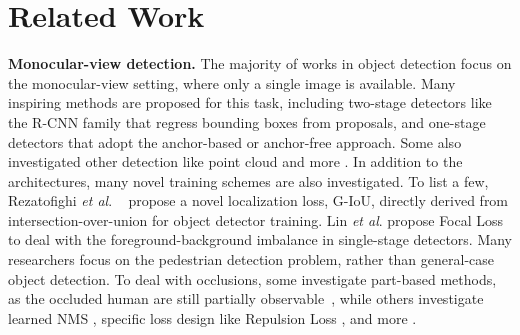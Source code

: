 \documentclass[sigconf,authorversion,nonacm]{acmart}
\newcommand{\etal}{\textit{et al}. }
\begin{document}
\section{Related Work}
\textbf{Monocular-view detection.} The majority of works in object detection focus on the monocular-view setting, where only a single image is available. Many inspiring methods are proposed for this task, including two-stage detectors like the R-CNN family \cite{ren2015faster,girshick2014rich} that regress bounding boxes from proposals, and one-stage detectors that adopt the anchor-based \cite{lin2017focal} or anchor-free \cite{tian2019fcos,zhou2019objects} approach. Some also investigated other detection like point cloud \cite{10.1145/3394171.3413805} and more \cite{10.1145/3394171.3413832,10.1145/3394171.3414427,10.1145/3394171.3413945,10.1145/3394171.3416297,10.1145/3394171.3413816}. 
In addition to the architectures, many novel training schemes are also investigated. To list a few, 
Rezatofighi \etal~\cite{rezatofighi2019generalized} propose a novel localization loss, G-IoU, directly derived from intersection-over-union for object detector training. 
Lin \etal \cite{lin2017focal} propose Focal Loss to deal with the foreground-background imbalance in single-stage detectors. 
Many researchers focus on the pedestrian detection problem, rather than general-case object detection. To deal with occlusions, some investigate part-based methods, as the occluded human are still partially observable~\cite{ouyang2015partial,tian2015deep,noh2018improving,zhang2018occlusion}, while others investigate learned NMS \cite{hosang2017learning}, specific loss design like Repulsion Loss \cite{wang2018repulsion}, and more \cite{10.1145/3394171.3413634,10.1145/3394171.3413989,10.1145/3394171.3413903}.
\end{document}
